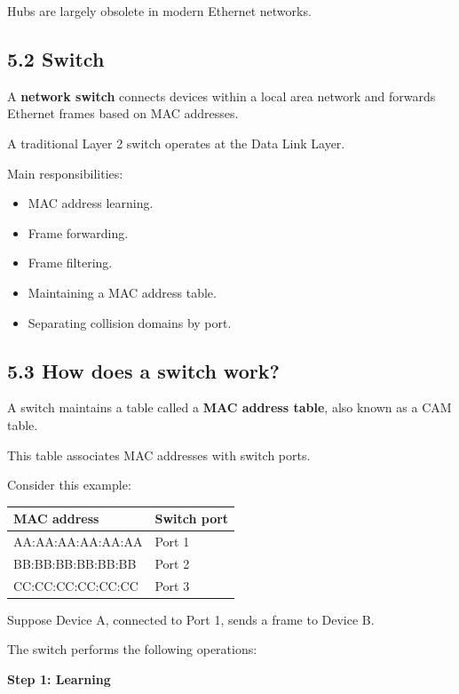 Hubs are largely obsolete in modern Ethernet networks.

\subsection{5.2 Switch}

A \textbf{network switch} connects devices within a local area network and forwards Ethernet frames based on MAC addresses.

A traditional Layer 2 switch operates at the Data Link Layer.

Main responsibilities:

\begin{itemize}
    \item MAC address learning.
    \item Frame forwarding.
    \item Frame filtering.
    \item Maintaining a MAC address table.
    \item Separating collision domains by port.
\end{itemize}

\subsection{5.3 How does a switch work?}

A switch maintains a table called a \textbf{MAC address table}, also known as a CAM table.

This table associates MAC addresses with switch ports.

Consider this example:

\begin{table}[htbp]
\centering
\begin{tabularx}{\textwidth}{p{4.3cm} X}
\toprule
\textbf{MAC address} & \textbf{Switch port} \\
\midrule
AA:AA:AA:AA:AA:AA & Port 1 \\
BB:BB:BB:BB:BB:BB & Port 2 \\
CC:CC:CC:CC:CC:CC & Port 3 \\
\bottomrule
\end{tabularx}
\end{table}

Suppose Device A, connected to Port 1, sends a frame to Device B.

The switch performs the following operations:

\textbf{Step 1: Learning}

